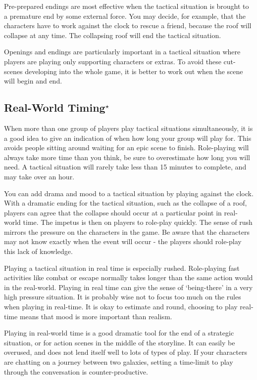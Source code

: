 \documentclass[twoside]{book}
\begin{document}
Pre-prepared endings are most effective when the tactical situation is
brought to a premature end by some external force. You may decide, for
example, that the characters have to work against the clock to rescue
a friend, because the roof will collapse at any time. The collapsing
roof will end the tactical situation.

Openings and endings are particularly important in a tactical
situation where players are playing only supporting characters or
extras. To avoid these cut-scenes developing into the whole game, it
is better to work out when the scene will begin and end.

\subsection{Real-World Timing$^\star$} %

When more than one group of players play tactical situations
simultaneously, it is a good idea to give an indication of when how
long your group will play for. This avoids people sitting around
waiting for an epic scene to finish. Role-playing will always take
more time than you think, be sure to overestimate how long you will
need. A tactical situation will rarely take less than 15 minutes to
complete, and may take over an hour.

You can add drama and mood to a tactical situation by playing against
the clock. With a dramatic ending for the tactical situation, such as
the collapse of a roof, players can agree that the collapse should
occur at a particular point in real-world time. The impetus is then on
players to role-play quickly. The sense of rush mirrors the pressure
on the characters in the game. Be aware that the characters may not
know exactly when the event will occur - the players should role-play
this lack of knowledge.

Playing a tactical situation in real time is especially
rushed. Role-playing fast activities like combat or escape normally
takes longer than the same action would in the real-world. Playing in
real time can give the sense of `being-there' in a very high pressure
situation. It is probably wise not to focus too much on the rules when
playing in real-time. It is okay to estimate and round, choosing to
play real-time means that mood is more important than realism.

Playing in real-world time is a good dramatic tool for the end of a
strategic situation, or for action scenes in the middle of the
storyline. It can easily be overused, and does not lend itself well to
lots of types of play. If your characters are chatting on a journey
between two galaxies, setting a time-limit to play through the
conversation is counter-productive.
\end{document}
